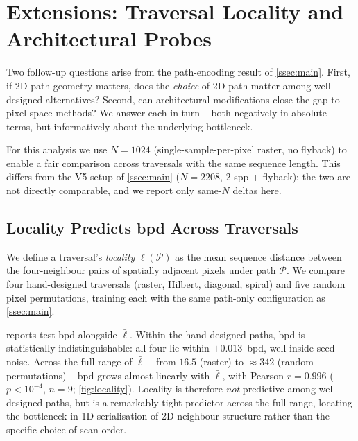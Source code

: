 \documentclass[conference]{IEEEtran}
\begin{document}
\section{Extensions: Traversal Locality and Architectural Probes}%
\label{sec:extensions}

Two follow-up questions arise from the path-encoding result of
\cref{ssec:main}. First, if 2D path geometry matters, does the
\emph{choice} of 2D path matter among well-designed alternatives?
Second, can architectural modifications close the gap to
pixel-space methods? We answer each in turn -- both negatively
in absolute terms, but informatively about the underlying
bottleneck.

For this analysis we use $N{=}1024$ (single-sample-per-pixel
raster, no flyback) to enable a fair comparison across traversals
with the same sequence length. This differs from the V5 setup of
\cref{ssec:main} ($N{=}2208$, 2-spp + flyback); the two are not
directly comparable, and we report only same-$N$ deltas here.

\subsection{Locality Predicts bpd Across Traversals}%
\label{ssec:locality}

We define a traversal's \emph{locality} $\bar{\ell}(\mathcal{P})$
as the mean sequence distance between the four-neighbour pairs of
spatially adjacent pixels under path $\mathcal{P}$. We compare
four hand-designed traversals (raster, Hilbert, diagonal, spiral)
and five random pixel permutations, training each with the same
path-only configuration as \cref{ssec:main}.



 reports test bpd alongside $\bar{\ell}$.
Within the hand-designed paths, bpd is statistically
indistinguishable: all four lie within $\pm0.013$~bpd, well
inside seed noise. Across the full range of $\bar{\ell}$ -- from
$16.5$ (raster) to $\approx 342$ (random permutations) -- bpd
grows almost linearly with $\bar{\ell}$, with Pearson $r{=}0.996$
($p<10^{-4}$, $n{=}9$; \cref{fig:locality}). Locality is
therefore \emph{not} predictive among well-designed paths, but is
a remarkably tight predictor across the full range, locating the
bottleneck in 1D serialisation of 2D-neighbour structure rather
than the specific choice of scan order.
\end{document}
